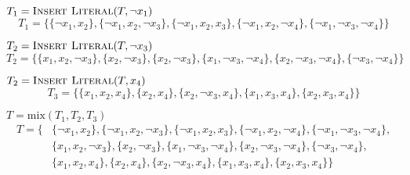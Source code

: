 \par $T_1 = 	\text{{\sc Insert Literal}}(T, \neg x_1)$
\[
		T_1 = \{\{\neg x_1, x_2\}, \{\neg x_1, x_2,\neg x_3\}, \{\neg x_1, x_2, x_3\}, \{\neg x_1, x_2,\neg x_4\}, \{\neg x_1,\neg x_3,\neg x_4\}\}
\]	
\par $T_2 =	\text{{\sc Insert Literal}}(T, \neg x_3)$
\[
		T_2 = \{\{x_1,x_2,\neg x_3\}, \{x_2,\neg x_3\}, \{x_2,\neg x_3\}, \{x_1,\neg x_3,\neg x_4\}, \{x_2,\neg x_3,\neg x_4\}, \{\neg x_3,\neg x_4\}\}
\]
\par $T_2 =	\text{{\sc Insert Literal}}(T, x_4)$
\[
		T_3 = \{\{x_1,x_2,x_4\}, \{x_2,x_4\}, \{x_2,\neg x_3,x_4\}, \{x_1,x_3,x_4\}, \{x_2,x_3,x_4\}\}
\]
\par $T = \text{mix}(T_1, T_2, T_3)$
\begin{align*}
		T = \{&\{\neg x_1,x_2\}, \{\neg x_1,x_2,\neg x_3\}, \{\neg x_1,x_2,x_3\}, \{\neg x_1,x_2,\neg x_4\}, \{\neg x_1,\neg x_3,\neg x_4\},\\
			  &\{x_1,x_2,\neg x_3\}, \{x_2,\neg x_3\}, \{x_1,\neg x_3,\neg x_4\}, \{x_2,\neg x_3,\neg x_4\}, \{\neg x_3,\neg x_4\},\\
			  &\{x_1,x_2,x_4\}, \{x_2,x_4\}, \{x_2,\neg x_3,x_4\}, \{x_1,x_3,x_4\}, \{x_2,x_3,x_4\}\}
\end{align*}
